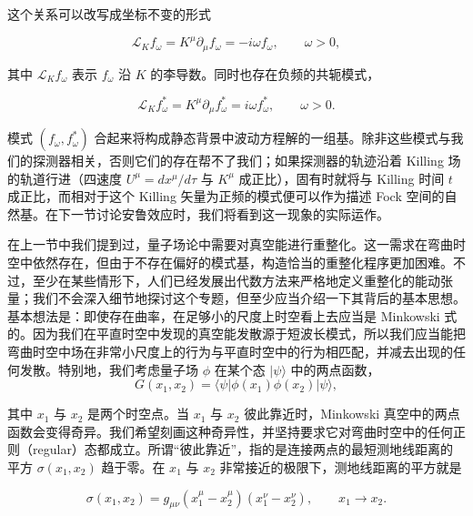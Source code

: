 这个关系可以改写成坐标不变的形式

\begin{equation*}
\mathcal{L}_K f_{\omega} = K^{\mu}\partial_{\mu}f_{\omega} = -i\omega f_{\omega}, \qquad \omega > 0,
\tag{9.118}
\end{equation*}

其中 $\mathcal{L}_K f_{\omega}$ 表示 $f_{\omega}$ 沿 $K$ 的李导数。同时也存在负频的共轭模式，

\begin{equation*}
\mathcal{L}_K f^{*}_{\omega} = K^{\mu}\partial_{\mu}f^{*}_{\omega} = i\omega f^{*}_{\omega}, \qquad \omega > 0.
\tag{9.119}
\end{equation*}

模式 $(f_{\omega}, f^{*}_{\omega})$ 合起来将构成静态背景中波动方程解的一组基。除非这些模式与我们的探测器相关，否则它们的存在帮不了我们；如果探测器的轨迹沿着 Killing 场的轨道行进（四速度 $U^{\mu} = dx^{\mu}/d\tau$ 与 $K^{\mu}$ 成正比），固有时就将与 Killing 时间 $t$ 成正比，而相对于这个 Killing 矢量为正频的模式便可以作为描述 Fock 空间的自然基。在下一节讨论安鲁效应时，我们将看到这一现象的实际运作。

在上一节中我们提到过，量子场论中需要对真空能进行重整化。这一需求在弯曲时空中依然存在，但由于不存在偏好的模式基，构造恰当的重整化程序更加困难。不过，至少在某些情形下，人们已经发展出代数方法来严格地定义重整化的能动张量；我们不会深入细节地探讨这个专题，但至少应当介绍一下其背后的基本思想。基本想法是：即使存在曲率，在足够小的尺度上时空看上去应当是 Minkowski 式的。因为我们在平直时空中发现的真空能发散源于短波长模式，所以我们应当能把弯曲时空中场在非常小尺度上的行为与平直时空中的行为相匹配，并减去出现的任何发散。特别地，我们考虑量子场 $\phi$ 在某个态 $|\psi\rangle$ 中的两点函数，
\begin{equation*}
G(x_1, x_2) = \langle\psi|\phi(x_1)\phi(x_2)|\psi\rangle,
\tag{9.120}
\end{equation*}

其中 $x_1$ 与 $x_2$ 是两个时空点。当 $x_1$ 与 $x_2$ 彼此靠近时，Minkowski 真空中的两点函数会变得奇异。我们希望刻画这种奇异性，并坚持要求它对弯曲时空中的任何正则（regular）态都成立。所谓“彼此靠近”，指的是连接两点的最短测地线距离的平方 $\sigma(x_1,x_2)$ 趋于零。在 $x_1$ 与 $x_2$ 非常接近的极限下，测地线距离的平方就是

\begin{equation*}
\sigma(x_1, x_2) = g_{\mu\nu}(x_1^{\mu} - x_2^{\mu})(x_1^{\nu} - x_2^{\nu}), \qquad x_1 \to x_2.
\tag{9.121}
\end{equation*}

